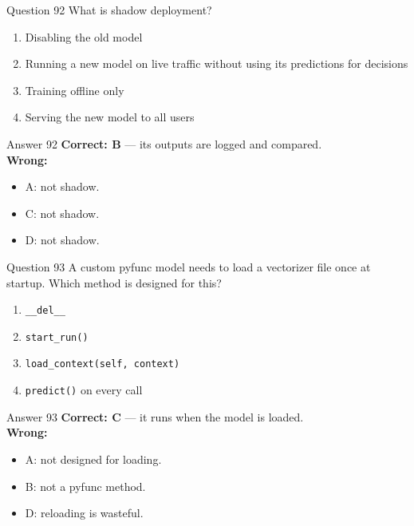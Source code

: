 \documentclass[aspectratio=169,11pt]{beamer}
\begin{document}
\begin{frame}{Question 92}
What is shadow deployment?
\begin{enumerate}[label=\Alph*.]
\item Disabling the old model
\item Running a new model on live traffic without using its predictions for decisions
\item Training offline only
\item Serving the new model to all users
\end{enumerate}
\end{frame}
\begin{frame}{Answer 92}
\textbf{Correct: B} --- its outputs are logged and compared.\\
\vspace{0.5em}
\textbf{Wrong:}
\begin{itemize}
\item A: not shadow.
\item C: not shadow.
\item D: not shadow.
\end{itemize}
\end{frame}

\begin{frame}{Question 93}
A custom pyfunc model needs to load a vectorizer file once at startup. Which method is designed for this?
\begin{enumerate}[label=\Alph*.]
\item \texttt{\_\_del\_\_}
\item \texttt{start\_run()}
\item \texttt{load\_context(self, context)}
\item \texttt{predict()} on every call
\end{enumerate}
\end{frame}
\begin{frame}{Answer 93}
\textbf{Correct: C} --- it runs when the model is loaded.\\
\vspace{0.5em}
\textbf{Wrong:}
\begin{itemize}
\item A: not designed for loading.
\item B: not a pyfunc method.
\item D: reloading is wasteful.
\end{itemize}
\end{frame}
\end{document}
